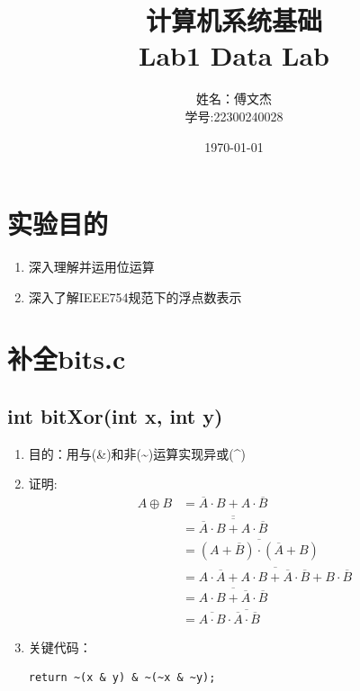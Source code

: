 \documentclass[12pt, a4paper, oneside]{ctexart}
\title{计算机系统基础 \\ Lab1 Data Lab} %
\author{姓名：傅文杰\\学号:22300240028} %
\date{\today} %
\begin{document}
\maketitle %

\tableofcontents %

\section{实验目的} %

\begin{enumerate}
    \item 深入理解并运用位运算
    \item 深入了解IEEE754规范下的浮点数表示
\end{enumerate}
\section{补全bits.c}
\subsection{int bitXor(int x, int y)}

\begin{enumerate}
    \item 目的：用与(\&)和非(\~{})运算实现异或(\^{}) 
    \item 证明:
    \begin{equation}
        \begin{aligned}
        A \oplus B &= \overline{A}\cdot B+A\cdot \overline{B} \\
        &= \overline{\overline{\overline{A}\cdot B+A\cdot \overline{B}}} \\
        &= \overline{(A+\overline{B})\cdot(\overline{A}+B)} \\
        &= \overline{A\cdot \overline{A} + A\cdot B + \overline{A}\cdot \overline{B} + B\cdot \overline{B}} \\
        &= \overline{A\cdot B + \overline{A}\cdot \overline{B}} \\
        &= \overline{A\cdot B}\cdot\overline{\overline{A}\cdot \overline{B}}
        \end{aligned}
        \nonumber
    \end{equation}
    \item 关键代码：
\begin{lstlisting}
return ~(x & y) & ~(~x & ~y);
\end{lstlisting}
\end{enumerate}
\end{document}

